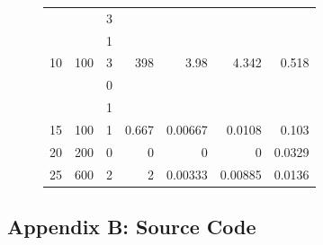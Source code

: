 \documentclass[a4paper]{article}
\begin{document}
\begin{figure}[H]
\begin{center}
\begin{adjustwidth}{-3.75cm}{}
\begin{tabular}{|r|r|r|r|r|r|r|}
        & & 3 & & & & \\
        & & 1 & & & & \\
        10 & 100 & 3 & 398 & 3.98 & 4.342 & \num{0.518} \\
        \hline
        & & 0 & & & & \\
        & & 1 & & & & \\
        15 & 100 & 1 & 0.667 & \num{0.00667} & \num{0.0108} & \num{0.103} \\
        \hline
        20 & 200 & 0 & 0 & 0 & 0 & \num{0.0329} \\
        \hline
        25 & 600 & 2 & 2 & \num{0.00333} & \num{0.00885} & \num{0.0136} \\
        \hline
      \end{tabular}
    \end{adjustwidth}
  \end{center}
  \label{tab:scatRatesAl}
\end{figure}

\subsection{Appendix B: Source Code}

%
%
%
%
%
\end{document}

